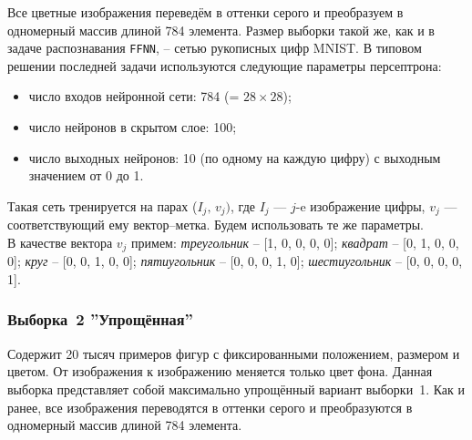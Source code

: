 \documentclass[12pt,a4paper]{article}
\newcommand{\ffnn}{\texttt{FFNN}}
\begin{document}
Все цветные изображения переведём в оттенки серого и преобразуем в одномерный массив длиной 784 элемента. Размер выборки такой же, как и в задаче распознавания \ffnn, -- сетью рукописных цифр MNIST. В типовом решении последней задачи используются следующие параметры персептрона:
\begin{itemize} 
\item число входов нейронной сети: 784 (= $28\times28$);
\item число нейронов в скрытом слое: 100;
\item число выходных нейронов: 10 (по одному на каждую цифру) с выходным значением от 0 до 1.
\end{itemize}
Такая сеть тренируется на парах ($I_{j},\,v_{j})$, 
где $I_{j}$ --- $j$-e изображение цифры, 
$v_{j}$ --- соответствующий ему вектор--метка.
Будем использовать те же параметры. \\
В качестве вектора $v_{j}$ примем: \emph{треугольник} -- [1, 0, 0, 0, 0]; \emph{квадрат} -- [0, 1, 0, 0, 0]; \emph{круг} -- [0, 0, 1, 0, 0]; \emph{пятиугольник} -- [0, 0, 0, 1, 0];  \emph{шестиугольник} -- [0, 0, 0, 0, 1].

\subsubsection*{Выборка \textnumero\,2 ''Упрощённая''}
Содержит 20 тысяч примеров фигур с фиксированными положением, 
размером и цветом. От изображения к изображению меняется только 
цвет фона. Данная выборка представляет собой максимально упрощённый вариант выборки \textnumero\,1. Как и ранее, все изображения переводятся в оттенки серого и преобразуются в одномерный массив длиной 784 элемента.
\end{document}
